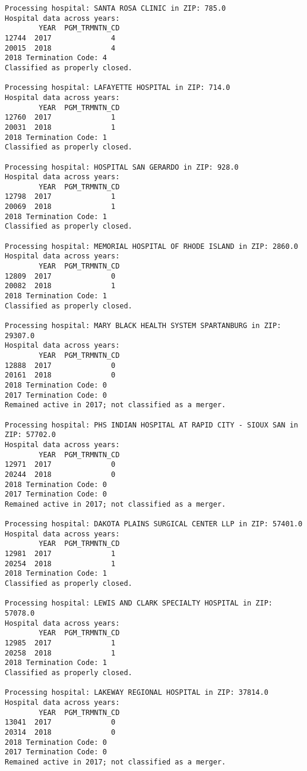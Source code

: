 \documentclass[
  letterpaper,
  DIV=11,
  numbers=noendperiod]{scrartcl}
\begin{document}
\begin{verbatim}
Processing hospital: SANTA ROSA CLINIC in ZIP: 785.0
Hospital data across years:
        YEAR  PGM_TRMNTN_CD
12744  2017              4
20015  2018              4
2018 Termination Code: 4
Classified as properly closed.

Processing hospital: LAFAYETTE HOSPITAL in ZIP: 714.0
Hospital data across years:
        YEAR  PGM_TRMNTN_CD
12760  2017              1
20031  2018              1
2018 Termination Code: 1
Classified as properly closed.

Processing hospital: HOSPITAL SAN GERARDO in ZIP: 928.0
Hospital data across years:
        YEAR  PGM_TRMNTN_CD
12798  2017              1
20069  2018              1
2018 Termination Code: 1
Classified as properly closed.

Processing hospital: MEMORIAL HOSPITAL OF RHODE ISLAND in ZIP: 2860.0
Hospital data across years:
        YEAR  PGM_TRMNTN_CD
12809  2017              0
20082  2018              1
2018 Termination Code: 1
Classified as properly closed.

Processing hospital: MARY BLACK HEALTH SYSTEM SPARTANBURG in ZIP: 29307.0
Hospital data across years:
        YEAR  PGM_TRMNTN_CD
12888  2017              0
20161  2018              0
2018 Termination Code: 0
2017 Termination Code: 0
Remained active in 2017; not classified as a merger.

Processing hospital: PHS INDIAN HOSPITAL AT RAPID CITY - SIOUX SAN in ZIP: 57702.0
Hospital data across years:
        YEAR  PGM_TRMNTN_CD
12971  2017              0
20244  2018              0
2018 Termination Code: 0
2017 Termination Code: 0
Remained active in 2017; not classified as a merger.

Processing hospital: DAKOTA PLAINS SURGICAL CENTER LLP in ZIP: 57401.0
Hospital data across years:
        YEAR  PGM_TRMNTN_CD
12981  2017              1
20254  2018              1
2018 Termination Code: 1
Classified as properly closed.

Processing hospital: LEWIS AND CLARK SPECIALTY HOSPITAL in ZIP: 57078.0
Hospital data across years:
        YEAR  PGM_TRMNTN_CD
12985  2017              1
20258  2018              1
2018 Termination Code: 1
Classified as properly closed.

Processing hospital: LAKEWAY REGIONAL HOSPITAL in ZIP: 37814.0
Hospital data across years:
        YEAR  PGM_TRMNTN_CD
13041  2017              0
20314  2018              0
2018 Termination Code: 0
2017 Termination Code: 0
Remained active in 2017; not classified as a merger.


\end{verbatim}
\end{document}
